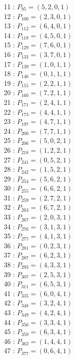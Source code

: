 \documentclass{article}
\begin{document}
{\begin{multicols}{3}
11 : $P_{95}=( 5, 2, 0, 1 )$\\
12 : $P_{100}=( 2, 3, 0, 1 )$\\
13 : $P_{112}=( 6, 4, 0, 1 )$\\
14 : $P_{118}=( 4, 5, 0, 1 )$\\
15 : $P_{129}=( 7, 6, 0, 1 )$\\
16 : $P_{133}=( 3, 7, 0, 1 )$\\
17 : $P_{139}=( 1, 0, 1, 1 )$\\
18 : $P_{146}=( 0, 1, 1, 1 )$\\
19 : $P_{155}=( 2, 2, 1, 1 )$\\
20 : $P_{160}=( 7, 2, 1, 1 )$\\
21 : $P_{171}=( 2, 4, 1, 1 )$\\
22 : $P_{173}=( 4, 4, 1, 1 )$\\
23 : $P_{197}=( 4, 7, 1, 1 )$\\
24 : $P_{200}=( 7, 7, 1, 1 )$\\
25 : $P_{206}=( 5, 0, 2, 1 )$\\
26 : $P_{218}=( 1, 2, 2, 1 )$\\
27 : $P_{241}=( 0, 5, 2, 1 )$\\
28 : $P_{242}=( 1, 5, 2, 1 )$\\
29 : $P_{254}=( 5, 6, 2, 1 )$\\
30 : $P_{255}=( 6, 6, 2, 1 )$\\
31 : $P_{259}=( 2, 7, 2, 1 )$\\
32 : $P_{263}=( 6, 7, 2, 1 )$\\
33 : $P_{267}=( 2, 0, 3, 1 )$\\
34 : $P_{276}=( 3, 1, 3, 1 )$\\
35 : $P_{277}=( 4, 1, 3, 1 )$\\
36 : $P_{281}=( 0, 2, 3, 1 )$\\
37 : $P_{287}=( 6, 2, 3, 1 )$\\
38 : $P_{293}=( 4, 3, 3, 1 )$\\
39 : $P_{307}=( 2, 5, 3, 1 )$\\
40 : $P_{311}=( 6, 5, 3, 1 )$\\
41 : $P_{335}=( 6, 0, 4, 1 )$\\
42 : $P_{348}=( 3, 2, 4, 1 )$\\
43 : $P_{349}=( 4, 2, 4, 1 )$\\
44 : $P_{356}=( 3, 3, 4, 1 )$\\
45 : $P_{359}=( 6, 3, 4, 1 )$\\
46 : $P_{362}=( 1, 4, 4, 1 )$\\
47 : $P_{377}=( 0, 6, 4, 1 )$\\

\end{multicols}}
\end{document}
